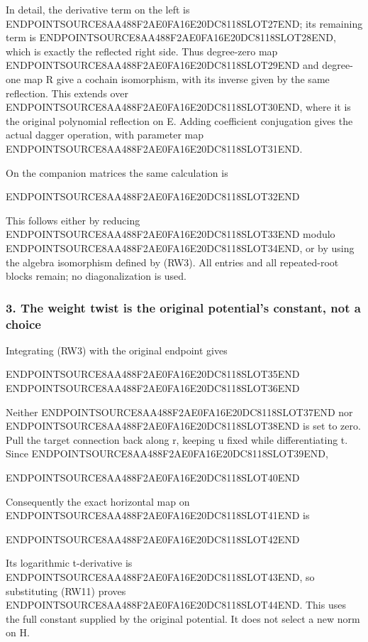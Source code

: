 In detail, the derivative term on the left is ENDPOINTSOURCE8AA488F2AE0FA16E20DC8118SLOT27END; its remaining term is ENDPOINTSOURCE8AA488F2AE0FA16E20DC8118SLOT28END, which is exactly the reflected right side. Thus degree-zero map ENDPOINTSOURCE8AA488F2AE0FA16E20DC8118SLOT29END and degree-one map R give a cochain isomorphism, with its inverse given by the same reflection. This extends over ENDPOINTSOURCE8AA488F2AE0FA16E20DC8118SLOT30END, where it is the original polynomial reflection on E. Adding coefficient conjugation gives the actual dagger operation, with parameter map ENDPOINTSOURCE8AA488F2AE0FA16E20DC8118SLOT31END.

On the companion matrices the same calculation is

ENDPOINTSOURCE8AA488F2AE0FA16E20DC8118SLOT32END

This follows either by reducing ENDPOINTSOURCE8AA488F2AE0FA16E20DC8118SLOT33END modulo ENDPOINTSOURCE8AA488F2AE0FA16E20DC8118SLOT34END, or by using the algebra isomorphism defined by (RW3). All entries and all repeated-root blocks remain; no diagonalization is used.

\subsubsection{3. The weight twist is the original potential's constant, not a choice}\label{endpoint-f1_reflection--the-weight-twist-is-the-original-potentials-constant-not-a-choice}

Integrating (RW3) with the original endpoint gives

ENDPOINTSOURCE8AA488F2AE0FA16E20DC8118SLOT35END ENDPOINTSOURCE8AA488F2AE0FA16E20DC8118SLOT36END

Neither ENDPOINTSOURCE8AA488F2AE0FA16E20DC8118SLOT37END nor ENDPOINTSOURCE8AA488F2AE0FA16E20DC8118SLOT38END is set to zero. Pull the target connection back along r, keeping u fixed while differentiating t. Since ENDPOINTSOURCE8AA488F2AE0FA16E20DC8118SLOT39END,

ENDPOINTSOURCE8AA488F2AE0FA16E20DC8118SLOT40END

Consequently the exact horizontal map on ENDPOINTSOURCE8AA488F2AE0FA16E20DC8118SLOT41END is

ENDPOINTSOURCE8AA488F2AE0FA16E20DC8118SLOT42END

Its logarithmic t-derivative is ENDPOINTSOURCE8AA488F2AE0FA16E20DC8118SLOT43END, so substituting (RW11) proves ENDPOINTSOURCE8AA488F2AE0FA16E20DC8118SLOT44END. This uses the full constant supplied by the original potential. It does not select a new norm on H.

